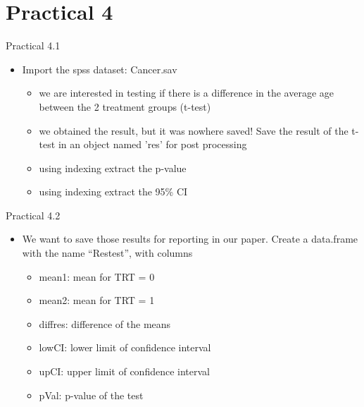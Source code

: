 \documentclass[14pt, aspectratio=169, sectionpage=simple, xclolor=table]{beamer}
\begin{document}
\section{Practical 4}
\begin{frame}{Practical 4.1}
\begin{itemize}
\item Import the spss dataset: Cancer.sav
\begin{itemize}
\item we are interested in testing if there is a difference in the average age between the 2 treatment groups (t-test)
\item we obtained the result, but it was nowhere saved! Save the result of the t-test in an object named 'res' for post processing
\item using indexing extract the p-value
\item using indexing extract the 95\% CI
\end{itemize}
\end{itemize}
\end{frame}
\begin{frame}{Practical 4.2}
\begin{itemize}
\item We want to save those results for reporting in our paper. Create a data.frame with the name \enquote{Restest}, with columns
\begin{itemize}
\item mean1: mean for TRT = 0
\item mean2: mean for TRT = 1
\item diffres: difference of the means
\item lowCI: lower limit of confidence interval
\item upCI: upper limit of confidence interval
\item pVal: p-value of the test
\end{itemize}
\end{itemize}
\end{frame}
\end{document}
